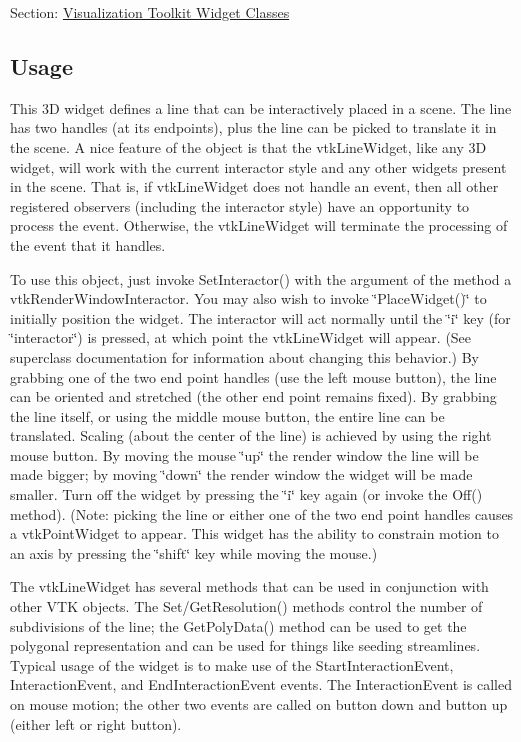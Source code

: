 Section\-: \hyperlink{sec_vtkwidgets}{Visualization Toolkit Widget Classes} \hypertarget{vtkwidgets_vtkxyplotwidget_Usage}{}\subsection{Usage}\label{vtkwidgets_vtkxyplotwidget_Usage}
This 3\-D widget defines a line that can be interactively placed in a scene. The line has two handles (at its endpoints), plus the line can be picked to translate it in the scene. A nice feature of the object is that the vtk\-Line\-Widget, like any 3\-D widget, will work with the current interactor style and any other widgets present in the scene. That is, if vtk\-Line\-Widget does not handle an event, then all other registered observers (including the interactor style) have an opportunity to process the event. Otherwise, the vtk\-Line\-Widget will terminate the processing of the event that it handles.

To use this object, just invoke Set\-Interactor() with the argument of the method a vtk\-Render\-Window\-Interactor. You may also wish to invoke \char`\"{}\-Place\-Widget()\char`\"{} to initially position the widget. The interactor will act normally until the \char`\"{}i\char`\"{} key (for \char`\"{}interactor\char`\"{}) is pressed, at which point the vtk\-Line\-Widget will appear. (See superclass documentation for information about changing this behavior.) By grabbing one of the two end point handles (use the left mouse button), the line can be oriented and stretched (the other end point remains fixed). By grabbing the line itself, or using the middle mouse button, the entire line can be translated. Scaling (about the center of the line) is achieved by using the right mouse button. By moving the mouse \char`\"{}up\char`\"{} the render window the line will be made bigger; by moving \char`\"{}down\char`\"{} the render window the widget will be made smaller. Turn off the widget by pressing the \char`\"{}i\char`\"{} key again (or invoke the Off() method). (Note\-: picking the line or either one of the two end point handles causes a vtk\-Point\-Widget to appear. This widget has the ability to constrain motion to an axis by pressing the \char`\"{}shift\char`\"{} key while moving the mouse.)

The vtk\-Line\-Widget has several methods that can be used in conjunction with other V\-T\-K objects. The Set/\-Get\-Resolution() methods control the number of subdivisions of the line; the Get\-Poly\-Data() method can be used to get the polygonal representation and can be used for things like seeding streamlines. Typical usage of the widget is to make use of the Start\-Interaction\-Event, Interaction\-Event, and End\-Interaction\-Event events. The Interaction\-Event is called on mouse motion; the other two events are called on button down and button up (either left or right button).

